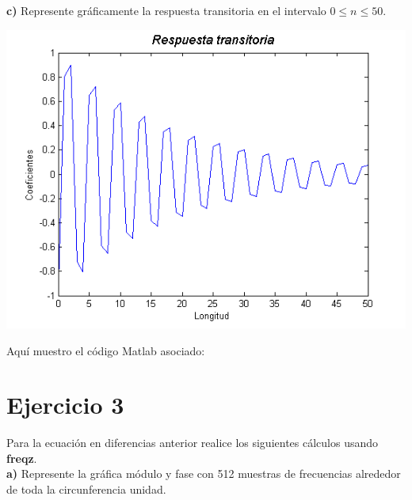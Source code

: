 \documentclass[a4paper,12pt]{article}
\begin{document}
\textbf{c)} Represente gráficamente la respuesta transitoria en el intervalo $0 \leq n \leq 50$.

\begin{center}
\includegraphics[width=.8 \textwidth]{respuesta-transitoria-ejercicio-2.png}
\end{center}

Aquí muestro el código Matlab asociado:\\


\section{Ejercicio 3}

Para la ecuación en diferencias anterior realice los siguientes cálculos usando \textbf{freqz}. \\

\textbf{a)} Represente la gráfica módulo y fase con 512 muestras de frecuencias alrededor de toda la circunferencia unidad. \\
\end{document}
